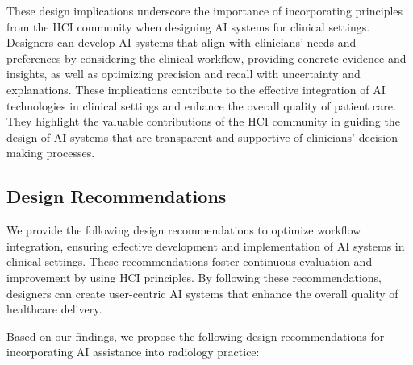 These design implications underscore the importance of incorporating principles from the \ac{HCI} community when designing \ac{AI} systems for clinical settings.
Designers can develop \ac{AI} systems that align with clinicians' needs and preferences by considering the clinical workflow, providing concrete evidence and insights, as well as optimizing precision and recall with uncertainty and explanations.
These implications contribute to the effective integration of \ac{AI} technologies in clinical settings and enhance the overall quality of patient care.
They highlight the valuable contributions of the \ac{HCI} community in guiding the design of \ac{AI} systems that are transparent and supportive of clinicians' decision-making processes.

\subsection{Design Recommendations}
\label{sec:chap005007003}

We provide the following design recommendations to optimize workflow integration, ensuring effective development and implementation of \ac{AI} systems in clinical settings.
These recommendations foster continuous evaluation and improvement by using \ac{HCI} principles.
By following these recommendations, designers can create user-centric \ac{AI} systems that enhance the overall quality of healthcare delivery.

\noindent
Based on our findings, we propose the following design recommendations for incorporating \ac{AI} assistance into radiology practice:

\vspace{0.025mm}

